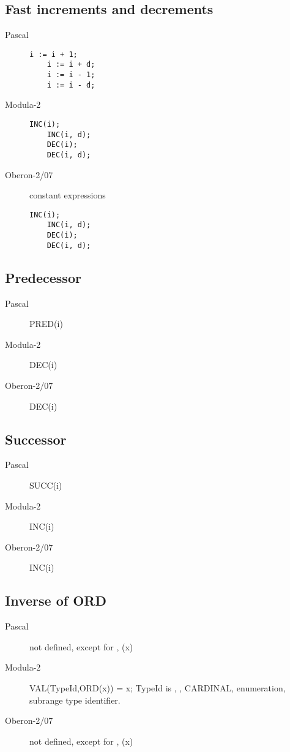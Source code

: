 \documentclass[10pt]{article}
\begin{document}
\subsection{Fast increments and decrements}
\begin{description}
    \item[Pascal]
    \begin{lstlisting}[style=example]   
    i := i + 1;
    i := i + d;
    i := i - 1;
    i := i - d;
    \end{lstlisting}
    
    \item[Modula-2]
    \begin{lstlisting}[style=example]   
    INC(i);
    INC(i, d);
    DEC(i);
    DEC(i, d);  
    \end{lstlisting}
    
    \item[Oberon-2/07] constant expressions
    \begin{lstlisting}[style=example]   
    INC(i);
    INC(i, d);
    DEC(i);
    DEC(i, d);   
    \end{lstlisting}
\end{description}

\subsection{Predecessor}
\begin{description}
    \item[Pascal] PRED(i)
    
    \item[Modula-2] DEC(i)
    
    \item[Oberon-2/07] DEC(i)
\end{description}

\subsection{Successor}
\begin{description}
    \item[Pascal] SUCC(i)
    
    \item[Modula-2] INC(i)
    
    \item[Oberon-2/07] INC(i)
\end{description}

\subsection{Inverse of ORD}
\begin{description}
    \item[Pascal] not defined, except for \CHAR, \CHR(x)
    
    \item[Modula-2] VAL(TypeId,ORD(x)) = x; TypeId is \CHAR, \INTEGER, CARDINAL, enumeration, subrange type identifier.
    
    \item[Oberon-2/07] not defined, except for \CHAR, \CHR(x)
\end{description}
\end{document}
